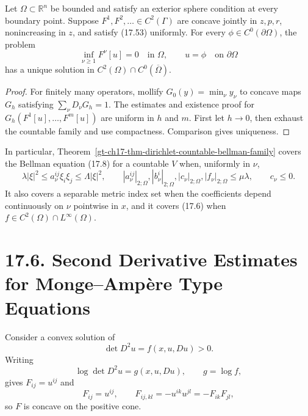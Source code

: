 \begin{theorem}
\label{gt-ch17-thm-dirichlet-countable-bellman-family}
Let $\Omega\subset\mathbb R^n$ be bounded and satisfy an exterior sphere
condition at every boundary point.  Suppose
$F^1,F^2,\ldots\in C^2(\Gamma)$ are concave jointly in $z,p,r$,
nonincreasing in $z$, and satisfy (17.53) uniformly.  For every
$\phi\in C^0(\partial\Omega)$, the problem
\begin{equation}\tag{17.61}
\inf_{\nu\ge1}F^\nu[u]=0\quad\text{in }\Omega,
\qquad u=\phi\quad\text{on }\partial\Omega
\end{equation}
has a unique solution in $C^2(\Omega)\cap C^0(\overline\Omega)$.
\end{theorem}
\begin{proof}
\sketch For finitely many operators, mollify
$G_0(y)=\min_\nu y_\nu$ to concave maps $G_h$ satisfying
$\sum_\nu D_\nu G_h=1$.  The estimates and existence proof for
$G_h(F^1[u],\ldots,F^m[u])$ are uniform in $h$ and $m$.  First let $h\to0$,
then exhaust the countable family and use compactness.  Comparison gives
uniqueness.
\end{proof}

In particular, Theorem~\ref{gt-ch17-thm-dirichlet-countable-bellman-family}
covers the Bellman equation (17.8) for a
countable $V$ when, uniformly in $\nu$,
\begin{equation}\tag{17.62}
\lambda|\xi|^2\le a_\nu^{ij}\xi_i\xi_j\le\Lambda|\xi|^2,
\qquad
|a_\nu^{ij}|_{2;\Omega},|b_\nu^i|_{2;\Omega},|c_\nu|_{2;\Omega},
|f_\nu|_{2;\Omega}\le\mu\lambda,
\qquad c_\nu\le0.
\end{equation}
It also covers a separable metric index set when the coefficients depend
continuously on $\nu$ pointwise in $x$, and it covers (17.6) when
$f\in C^2(\Omega)\cap L^\infty(\Omega)$.

\section*{17.6. Second Derivative Estimates for Monge--Amp\`ere Type Equations}

Consider a convex solution of
\begin{equation}\tag{17.63}
\det D^2u=f(x,u,Du)>0.
\end{equation}
Writing
\begin{equation}\tag{17.64}
\log\det D^2u=g(x,u,Du),
\qquad g=\log f,
\end{equation}
gives $F_{ij}=u^{ij}$ and
\begin{equation}
\tag{17.65}
F_{ij}=u^{ij},
\qquad F_{ij,kl}=-u^{ik}u^{jl}=-F_{ik}F_{jl},
\end{equation}
so $F$ is concave on the positive cone.

